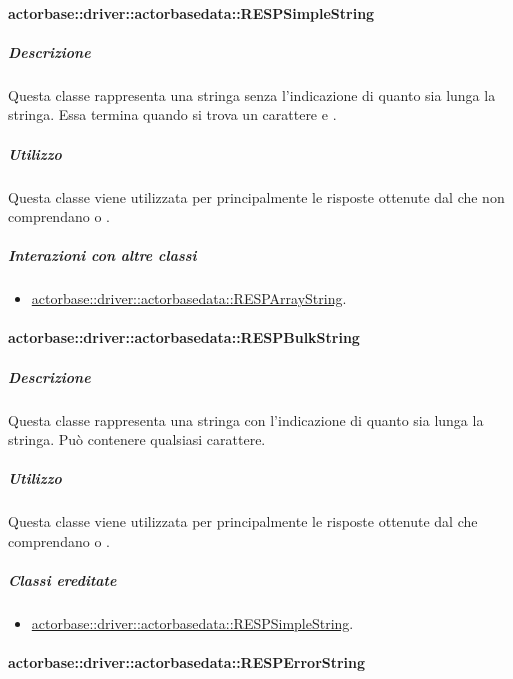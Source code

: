 \documentclass{scalatekids-article}
\begin{document}
\paragraph{actorbase::driver::actorbasedata::RESPSimpleString}
\label{sec:actorbase::driver::actorbasedata::RESPSimpleString}

\subparagraph{Descrizione}

Questa classe rappresenta una stringa senza l'indicazione di quanto sia lunga
la stringa. Essa termina quando si trova un carattere 
e .

\subparagraph{Utilizzo}

Questa classe viene utilizzata per  principalmente le
risposte ottenute dal  che non comprendano  o
.

\subparagraph{Interazioni con altre classi}

\begin{itemize}
\item \hyperref[sec:actorbase::driver::actorbasedata::RESPArrayString]{actorbase::driver::actorbasedata::RESPArrayString}.
\end{itemize}

\paragraph{actorbase::driver::actorbasedata::RESPBulkString}
\label{sec:actorbase::driver::actorbasedata::RESPBulkString}

\subparagraph{Descrizione}

Questa classe rappresenta una stringa con l'indicazione di quanto sia lunga la
stringa. Può contenere qualsiasi carattere.

\subparagraph{Utilizzo}

Questa classe viene utilizzata per  principalmente le
risposte ottenute dal  che comprendano  o
.

\subparagraph{Classi ereditate}

\begin{itemize}
\item \hyperref[sec:actorbase::driver::actorbasedata::RESPSimpleString]{actorbase::driver::actorbasedata::RESPSimpleString}.
\end{itemize}

\paragraph{actorbase::driver::actorbasedata::RESPErrorString}
\label{sec:actorbase::driver::actorbasedata::RESPErrorString}
\end{document}
